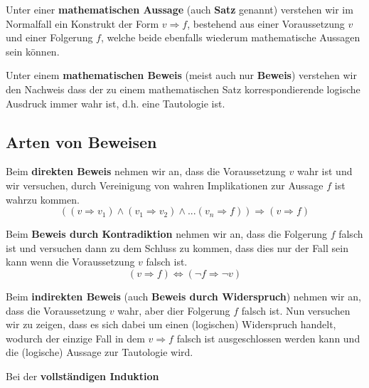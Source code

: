 \documentclass[../../main.tex]{subfiles}
\begin{document}
	
	\begin{definition}
		\label{def:MathematischeAussage}
		Unter einer \textbf{mathematischen Aussage} (auch \textbf{Satz} genannt) verstehen wir im Normalfall ein Konstrukt der Form $v \Rightarrow f$, bestehend aus einer Voraussetzung $v$ und einer Folgerung $f$, welche beide ebenfalls wiederum mathematische Aussagen sein können.
	\end{definition}

	\begin{definition}
		\label{def:MathematischerBeweis}
		Unter einem \textbf{mathematischen Beweis} (meist auch nur \textbf{Beweis}) verstehen wir den Nachweis dass der zu einem mathematischen Satz korrespondierende logische Ausdruck immer wahr ist, d.h. eine Tautologie ist.
	\end{definition}

	\subsection{Arten von Beweisen}
	\begin{definition}
		Beim \textbf{direkten Beweis} nehmen wir an, dass die Voraussetzung $v$ wahr ist und wir versuchen, durch Vereinigung von wahren Implikationen zur Aussage \dq$f$ ist wahr\dq zu kommen.
		$$((v \Rightarrow v_1) \land (v_1 \Rightarrow v_2) \land ... (v_n \Rightarrow f)) \Rightarrow (v \Rightarrow f)$$
	\end{definition}

	\begin{definition}
		Beim \textbf{Beweis durch Kontradiktion} nehmen wir an, dass die Folgerung $f$ falsch ist und versuchen dann zu dem Schluss zu kommen, dass dies nur der Fall sein kann wenn die Voraussetzung $v$ falsch ist. 
		$$(v \Rightarrow f) \Leftrightarrow (\lnot f \Rightarrow \lnot v)$$
	\end{definition}

	\begin{definition}
		Beim \textbf{indirekten Beweis} (auch \textbf{Beweis durch Widerspruch}) nehmen wir an, dass die Voraussetzung $v$ wahr, aber dier Folgerung $f$ falsch ist. Nun versuchen wir zu zeigen, dass es sich dabei um einen (logischen) Widerspruch handelt, wodurch der einzige Fall in dem $v \Rightarrow f$ falsch ist ausgeschlossen werden kann und die (logische) Aussage zur Tautologie wird.
	\end{definition}

	\begin{definition}
		Bei der \textbf{vollständigen Induktion}
	\end{definition}
\end{document}
